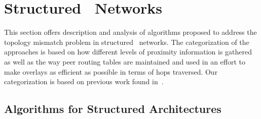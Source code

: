 \section{Structured \p\ Networks}
\label{section:structured}

This section offers description and analysis of algorithms proposed
to address the topology mismatch problem in structured \p\ networks. 
The categorization of the approaches is based on how different
levels of proximity information is gathered as well as  
the way peer routing tables are maintained and used in an effort to make 
overlays as efficient as possible in terms of hops traversed.
Our categorization is based on previous work 
found in~\cite{CDHR2002,CDCR2002,RSS2002}.

\subsection{Algorithms for Structured Architectures}






